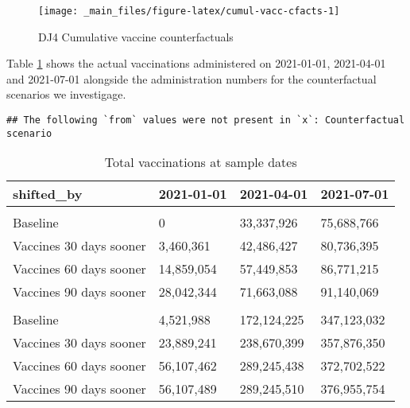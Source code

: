 \documentclass{article}
\begin{document}
\begin{figure}

{\centering \texttt{[image: \_main\_files/figure-latex/cumul-vacc-cfacts-1]} 

}

\caption{DJ4 Cumulative vaccine counterfactuals}\label{fig:cumul-vacc-cfacts}
\end{figure}

Table \ref{tab:vaccinations-table} shows the actual vaccinations administered on 2021-01-01, 2021-04-01 and 2021-07-01 alongside the administration numbers for the counterfactual scenarios we investigage.

\begin{verbatim}
## The following `from` values were not present in `x`: Counterfactual scenario
\end{verbatim}

\begin{table}

\caption{\label{tab:vaccinations-table}Total vaccinations at sample dates}
\centering
\begin{tabular}[t]{llll}
\toprule
shifted\_by & 2021-01-01 & 2021-04-01 & 2021-07-01\\
\midrule
\addlinespace[0.3em]
\multicolumn{4}{l}{\textbf{United Kingdom}}\\
\hspace{1em}Baseline & 0 & 33,337,926 & 75,688,766\\
\hspace{1em}Vaccines 30 days sooner & 3,460,361 & 42,486,427 & 80,736,395\\
\hspace{1em}Vaccines 60 days sooner & 14,859,054 & 57,449,853 & 86,771,215\\
\hspace{1em}Vaccines 90 days sooner & 28,042,344 & 71,663,088 & 91,140,069\\
\addlinespace[0.3em]
\multicolumn{4}{l}{\textbf{United States}}\\
\hspace{1em}Baseline & 4,521,988 & 172,124,225 & 347,123,032\\
\hspace{1em}Vaccines 30 days sooner & 23,889,241 & 238,670,399 & 357,876,350\\
\hspace{1em}Vaccines 60 days sooner & 56,107,462 & 289,245,438 & 372,702,522\\
\hspace{1em}Vaccines 90 days sooner & 56,107,489 & 289,245,510 & 376,955,754\\
\bottomrule
\end{tabular}
\end{table}
\end{document}
